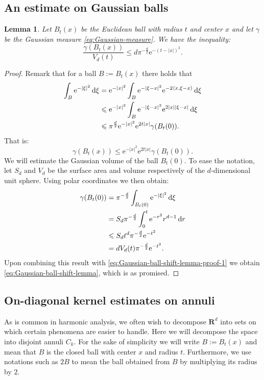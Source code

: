 \documentclass[a4paper,oneside,10pt]{amsproc}
\theoremstyle{plain}
\newtheorem{lemma}{Lemma}
\theoremstyle{remark}
\newcommand{\D}{\,\textup{d}}
\newcommand{\la}{\langle}
\newcommand{\ra}{\rangle}
\renewcommand{\leq}{\leqslant}
\renewcommand{\leq}{\leqslant}
\newcommand{\R}{\mathbf R}
\newcommand{\e}{\mathrm{e}} %
\renewcommand{\leq}{\leqslant}%
\begin{document}
\subsection{An estimate on Gaussian balls}
\begin{lemma}\label{lem:Gaussian-ball-shift-lemma}
  Let $B_t(x)$ be the Euclidean ball with radius $t$ and center $x$
  and let $\gamma$ be the Gaussian measure
  \eqref{eq:Gaussian-measure}. We have the inequality:
  \begin{equation}\label{eq:Gaussian-ball-shift-lemma}
    \frac{\gamma(B_t(x))}{V_d(t)} \leq d \pi^{-\frac{d}2} \e^{-(t -
      |x|)^2}.
  \end{equation}
\end{lemma}
\begin{proof}
  Remark that for a ball $B:= B_t(x)$ there holds that
  \begin{align*}
    \int_B \e^{-|\xi|^2} \D\xi &= \e^{-|x|^2} \int_{B} \e^{-|\xi -
      x|^2} \e^{-2 \la x, \xi - x \ra} \D\xi\\
    &\leq \e^{-|x|^2} \int_{B} \e^{-|\xi - x|^2} \e^{2 |x| |\xi - x|}
    \D\xi\\
    &\leq \pi^{\frac{d}2} \e^{-|x|^2} \e^{2 t |x|} \gamma(B_t(0)).
  \end{align*}
  That is:
  \begin{equation}\label{eq:Gaussian-ball-shift-lemma-proof-1}
    \gamma(B_t(x)) \leq \e^{-|x|^2} \e^{2 t |x|} \gamma(B_t(0)).
  \end{equation}
  We will estimate the Gaussian volume of the ball $B_t(0)$. To ease
  the notation, let $S_d$ and $V_d$ be the surface area and volume
  respectively of the $d$-dimensional unit sphere. Using polar coordinates
  we then obtain: 
  \begin{align*}
    \gamma(B_t(0)) &= \pi^{-\frac{d}2} \int_{B_t(0)} \e^{-|\xi|^2} \D\xi\\
    &= S_d \pi^{-\frac{d}2} \int_0^t \e^{-r^2} r^{d - 1} \D{r}\\
    &\leq S_d t^d \pi^{-\frac{d}2}\e^{-t^2}\\
    &= d V_d(t) \pi^{-\frac{d}2}\e^{-t^2}.
  \end{align*}
  Upon combining this result with
  \eqref{eq:Gaussian-ball-shift-lemma-proof-1} we obtain
  \eqref{eq:Gaussian-ball-shift-lemma}, which is as promised.
\end{proof}

\subsection{On-diagonal kernel estimates on annuli}
As is common in harmonic analysis, we often wish to decompose
$\R^d$ into sets on which certain phenomena are easier to handle. Here
we will decompose the space into disjoint annuli $C_k$. For the sake
of simplicity we will write $B := B_t(x)$ and mean that $B$ is the
closed ball with center $x$ and radius $t$. Furthermore, we use
notations such as $2B$ to mean the ball obtained from $B$ by
multiplying its radius by $2$.
\end{document}
